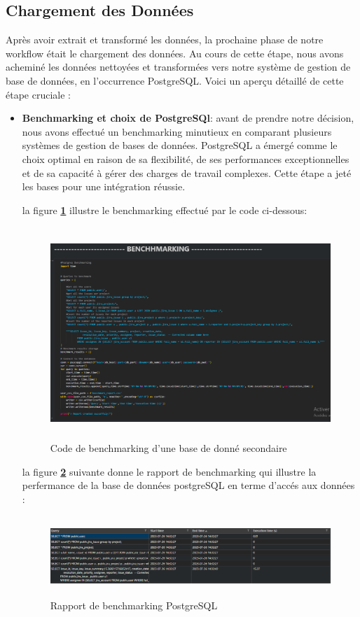         \subsection{Chargement des Données}
        \par Après avoir extrait et transformé les données, la prochaine phase de notre workflow était le chargement des données. Au cours de cette étape, nous avons acheminé les données nettoyées et transformées vers notre système de gestion de base de données, en l'occurrence PostgreSQL. Voici un aperçu détaillé de cette étape cruciale :
        \begin{itemize}
            \item \textbf{Benchmarking et choix de PostgreSQl}: avant de prendre notre décision, nous avons effectué un benchmarking minutieux en comparant plusieurs systèmes de gestion de bases de données. PostgreSQL a émergé comme le choix optimal en raison de sa flexibilité, de ses performances exceptionnelles et de sa capacité à gérer des charges de travail complexes. Cette étape a jeté les bases pour une intégration réussie.
            \par la figure \textbf{\ref{fig:bench}} illustre le benchmarking effectué par le code ci-dessous: 
            \begin{figure}[H]
                \centering
                \includegraphics[width=1\linewidth, height=8cm]{img//captures/benchmarking.png}
                \caption{Code de benchmarking d'une base de donné secondaire}
                \label{fig:bench}
            \end{figure}
            \par la figure \textbf{\ref{fig:report}} suivante donne le rapport de benchmarking qui illustre la perfermance de la base de données postgreSQL en terme d'accés aux données : 
            \begin{figure}[H]
                \centering
                \includegraphics[width=1\linewidth, height=3cm]{report_bench.png}
                \caption{Rapport de benchmarking PostgreSQL}
                \label{fig:report}
            \end{figure}
            

\end{itemize}
